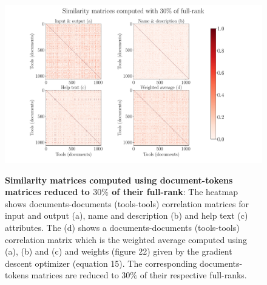 \begin{figure}[h]
\begin{centering}
    {\includegraphics[scale=0.4]{figures/Similarity_matrices_030.pdf}}
    \caption[Similarity matrices computed using document-tokens matrices reduced to $30\%$ of their full-rank]{\textbf{Similarity matrices computed using document-tokens matrices reduced to $30\%$ of their full-rank}: The heatmap shows documents-documents (tools-tools) correlation matrices for input and output (a), name and description (b) and help text (c) attributes. The (d) shows a documents-documents (tools-tools) correlation matrix which is the weighted average computed using (a), (b) and (c) and weights (figure 22) given by the gradient descent optimizer (equation 15). The corresponding documents-tokens matrices are reduced to $30\%$ of their respective full-ranks.}
\end{centering}
\end{figure}

